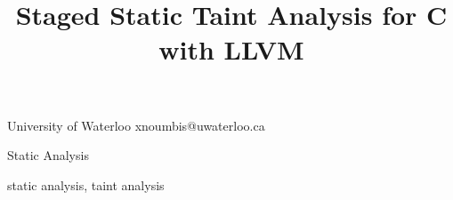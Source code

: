 \documentclass{sigplanconf}
\begin{document}


\title{Staged Static Taint Analysis for C with LLVM}

\date{}

           {University of Waterloo}
           {xnoumbis@uwaterloo.ca}

\maketitle




\terms
Static Analysis

\keywords
static analysis, taint analysis

















\appendix












\end{document}
